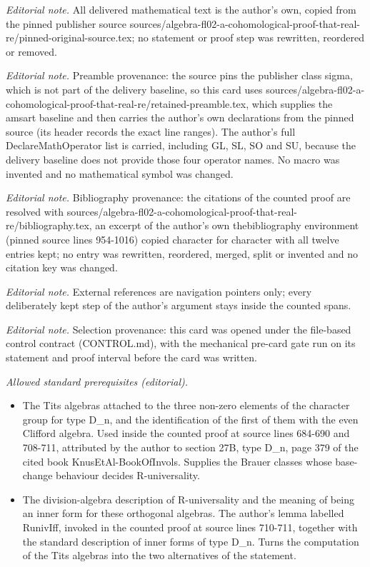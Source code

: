 \maketitle
\noindent\textit{Editorial note.} All delivered mathematical text is the author's own, copied from the pinned publisher source sources/algebra-fl02-a-cohomological-proof-that-real-re/pinned-original-source.tex; no statement or proof step was rewritten, reordered or removed.\par\medskip
\noindent\textit{Editorial note.} Preamble provenance: the source pins the publisher class sigma, which is not part of the delivery baseline, so this card uses sources/algebra-fl02-a-cohomological-proof-that-real-re/retained-preamble.tex, which supplies the amsart baseline and then carries the author's own declarations from the pinned source (its header records the exact line ranges). The author's full DeclareMathOperator list is carried, including GL, SL, SO and SU, because the delivery baseline does not provide those four operator names. No macro was invented and no mathematical symbol was changed.\par\medskip
\noindent\textit{Editorial note.} Bibliography provenance: the citations of the counted proof are resolved with sources/algebra-fl02-a-cohomological-proof-that-real-re/bibliography.tex, an excerpt of the author's own thebibliography environment (pinned source lines 954-1016) copied character for character with all twelve entries kept; no entry was rewritten, reordered, merged, split or invented and no citation key was changed.\par\medskip
\noindent\textit{Editorial note.} External references are navigation pointers only; every deliberately kept step of the author's argument stays inside the counted spans.\par\medskip
\noindent\textit{Editorial note.} Selection provenance: this card was opened under the file-based control contract (CONTROL.md), with the mechanical pre-card gate run on its statement and proof interval before the card was written.\par\medskip
\noindent\textit{Allowed standard prerequisites (editorial).}\begin{itemize}
\item The Tits algebras attached to the three non-zero elements of the character group for type D\_n, and the identification of the first of them with the even Clifford algebra. Used inside the counted proof at source lines 684-690 and 708-711, attributed by the author to section 27B, type D\_n, page 379 of the cited book KnusEtAl-BookOfInvols. Supplies the Brauer classes whose base-change behaviour decides R-universality.
\item The division-algebra description of R-universality and the meaning of being an inner form for these orthogonal algebras. The author's lemma labelled RunivIff, invoked in the counted proof at source lines 710-711, together with the standard description of inner forms of type D\_n. Turns the computation of the Tits algebras into the two alternatives of the statement.
\end{itemize}\medskip
